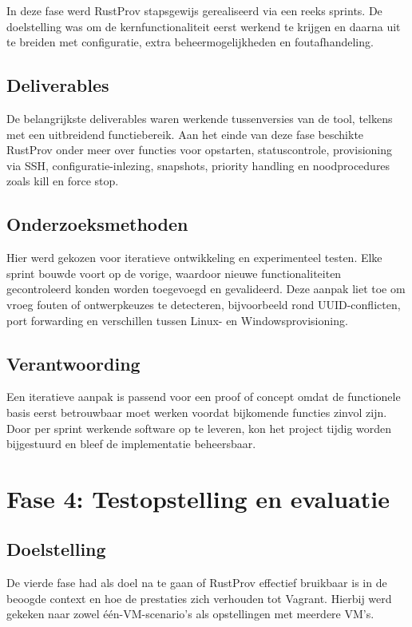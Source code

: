 In deze fase werd RustProv stapsgewijs gerealiseerd via een reeks sprints. De doelstelling was om de kernfunctionaliteit eerst werkend te krijgen en daarna uit te breiden met configuratie, extra beheermogelijkheden en foutafhandeling.

\subsection{Deliverables}

De belangrijkste deliverables waren werkende tussenversies van de tool, telkens met een uitbreidend functiebereik. Aan het einde van deze fase beschikte RustProv onder meer over functies voor opstarten, statuscontrole, provisioning via SSH, configuratie-inlezing, snapshots, priority handling en noodprocedures zoals kill en force stop. 

\subsection{Onderzoeksmethoden}

Hier werd gekozen voor iteratieve ontwikkeling en experimenteel testen. Elke sprint bouwde voort op de vorige, waardoor nieuwe functionaliteiten gecontroleerd konden worden toegevoegd en gevalideerd. Deze aanpak liet toe om vroeg fouten of ontwerpkeuzes te detecteren, bijvoorbeeld rond UUID-conflicten, port forwarding en verschillen tussen Linux- en Windowsprovisioning. 

\subsection{Verantwoording}

Een iteratieve aanpak is passend voor een proof of concept omdat de functionele basis eerst betrouwbaar moet werken voordat bijkomende functies zinvol zijn. Door per sprint werkende software op te leveren, kon het project tijdig worden bijgestuurd en bleef de implementatie beheersbaar. 

\section{Fase 4: Testopstelling en evaluatie}

\subsection{Doelstelling}

De vierde fase had als doel na te gaan of RustProv effectief bruikbaar is in de beoogde context en hoe de prestaties zich verhouden tot Vagrant. Hierbij werd gekeken naar zowel één-VM-scenario’s als opstellingen met meerdere VM’s. 

